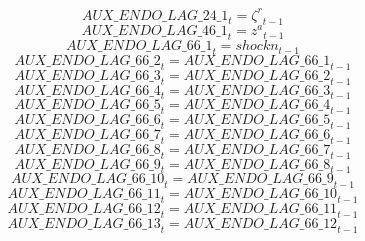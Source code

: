 \begin{dmath}
{AUX\_ENDO\_LAG\_24\_1}_{t}={{\zeta^{r}}}_{t-1}
\end{dmath}
\begin{dmath}
{AUX\_ENDO\_LAG\_46\_1}_{t}={{z^a}}_{t-1}
\end{dmath}
\begin{dmath}
{AUX\_ENDO\_LAG\_66\_1}_{t}={{shockn}}_{t-1}
\end{dmath}
\begin{dmath}
{AUX\_ENDO\_LAG\_66\_2}_{t}={AUX\_ENDO\_LAG\_66\_1}_{t-1}
\end{dmath}
\begin{dmath}
{AUX\_ENDO\_LAG\_66\_3}_{t}={AUX\_ENDO\_LAG\_66\_2}_{t-1}
\end{dmath}
\begin{dmath}
{AUX\_ENDO\_LAG\_66\_4}_{t}={AUX\_ENDO\_LAG\_66\_3}_{t-1}
\end{dmath}
\begin{dmath}
{AUX\_ENDO\_LAG\_66\_5}_{t}={AUX\_ENDO\_LAG\_66\_4}_{t-1}
\end{dmath}
\begin{dmath}
{AUX\_ENDO\_LAG\_66\_6}_{t}={AUX\_ENDO\_LAG\_66\_5}_{t-1}
\end{dmath}
\begin{dmath}
{AUX\_ENDO\_LAG\_66\_7}_{t}={AUX\_ENDO\_LAG\_66\_6}_{t-1}
\end{dmath}
\begin{dmath}
{AUX\_ENDO\_LAG\_66\_8}_{t}={AUX\_ENDO\_LAG\_66\_7}_{t-1}
\end{dmath}
\begin{dmath}
{AUX\_ENDO\_LAG\_66\_9}_{t}={AUX\_ENDO\_LAG\_66\_8}_{t-1}
\end{dmath}
\begin{dmath}
{AUX\_ENDO\_LAG\_66\_10}_{t}={AUX\_ENDO\_LAG\_66\_9}_{t-1}
\end{dmath}
\begin{dmath}
{AUX\_ENDO\_LAG\_66\_11}_{t}={AUX\_ENDO\_LAG\_66\_10}_{t-1}
\end{dmath}
\begin{dmath}
{AUX\_ENDO\_LAG\_66\_12}_{t}={AUX\_ENDO\_LAG\_66\_11}_{t-1}
\end{dmath}
\begin{dmath}
{AUX\_ENDO\_LAG\_66\_13}_{t}={AUX\_ENDO\_LAG\_66\_12}_{t-1}
\end{dmath}
